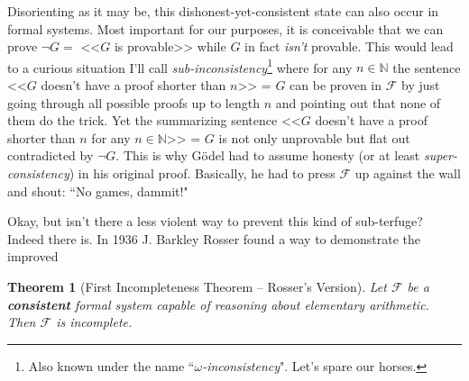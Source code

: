 \documentclass{article}
\theoremstyle{theorem}
\newtheorem{theorem}{Theorem}
\begin{document}
Disorienting as it may be, this dishonest-yet-consistent state can also occur in formal systems. Most important for our purposes, it is conceivable that we can prove $\neg G =$ <<$G$ is provable>> while $G$ in fact \textit{isn't} provable. This would lead to a curious situation I'll call \textit{sub-inconsistency}\footnote{Also known under the name ``\textit{$\omega$-inconsistency}". Let's spare our horses.} where for any $n\in\mathbb{N}$ the sentence <<$G$ doesn't have a proof shorter than $n$>> = $G$ can be proven in $\mathcal{F}$ by just going through all possible proofs up to length $n$ and pointing out that none of them do the trick. Yet the summarizing sentence <<$G$ doesn't have a proof shorter than $n$ for any $n\in\mathbb{N}$>> = $G$ is not only unprovable but flat out contradicted by $\neg G$. This is why Gödel had to assume honesty (or at least \textit{super-consistency}) in his original proof. Basically, he had to press $\mathcal{F}$ up against the wall and shout: ``No games, dammit!"

Okay, but isn't there a less violent way to prevent this kind of sub-terfuge? Indeed there is. In 1936 J. Barkley Rosser found a way to demonstrate the improved

\begin{theorem}[First Incompleteness Theorem -- Rosser's Version]
Let $\mathcal{F}$ be a \textbf{consistent} formal system capable of reasoning about elementary arithmetic. Then $\mathcal{F}$ is incomplete.
\end{theorem}
\end{document}
